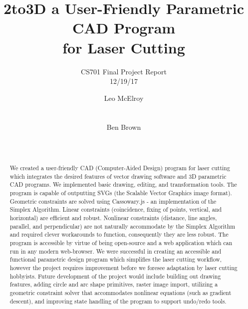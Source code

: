 \documentclass{sig-alternate-05-2015}
\begin{document}
\title{2to3D a User-Friendly Parametric CAD Program\\for Laser Cutting}
\subtitle{CS701 Final Project Report \\ 12/19/17}


\author{
%
\alignauthor
Leo McElroy\\
       \\
       \\
\alignauthor
Ben Brown\\
       \\
       \\
}

\maketitle

\begin{abstract}

We created a user-friendly CAD (Computer-Aided Design) program for laser cutting which integrates the desired features of vector drawing software and 3D parametric CAD programs. We implemented basic drawing, editing, and transformation tools. The program is capable of outputting SVGs (the Scalable Vector Graphics image format). Geometric constraints are solved using Cassowary.js - an implementation of the Simplex Algorithm. Linear constraints (coincidence, fixing of points, vertical, and horizontal) are efficient and robust. Nonlinear constraints (distance, line angles, parallel, and perpendicular) are not naturally accommodate by the Simplex Algorithm and required clever workarounds to function, consequently they are less robust. The program is accessible by virtue of being open-source and a web application which can run in any modern web-browser. We were successful in creating an accessible and functional parametric design program which simplifies the laser cutting workflow, however the project requires improvement before we foresee adaptation by laser cutting hobbyists. Future development of the project would include building out drawing features, adding circle and arc shape primitives, raster image import, utilizing a geometric constraint solver that accommodates nonlinear equations (such as gradient descent), and improving state handling of the program to support undo/redo tools.

\end{abstract}

















 

\end{document}
